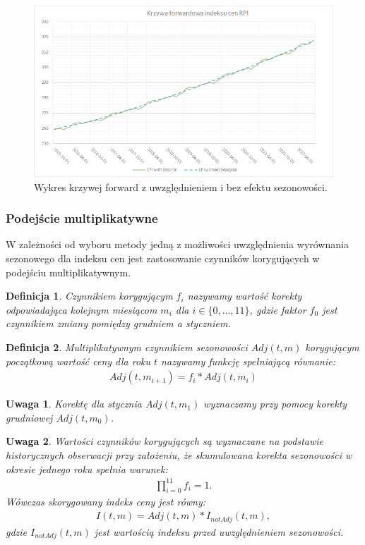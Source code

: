 \documentclass{mini}
\theoremstyle{mythstyle}
\newtheorem{Definicja}{Definicja}[chapter]
\newtheorem{Uwaga}{Uwaga}[chapter]
\begin{document}
	\begin{figure} [!h]
		\centering
		\includegraphics[scale=0.75]{graphics/rpi.png}
		\caption{Wykres krzywej forward z uwzględnieniem i bez efektu sezonowości.}
	\end{figure}
		
	\subsubsection*{Podejście multiplikatywne}
		W zależności od wyboru metody jedną z możliwości uwzględnienia wyrównania sezonowego dla indeksu cen jest zastosowanie czynników korygujących w podejściu multiplikatywnym.
	\begin{Definicja}
		Czynnikiem korygującym $f_i$ nazywamy wartość korekty odpowiadająca kolejnym miesiącom $m_i$ dla $i \in \{0,...,11\}$, gdzie faktor $f_0$ jest czynnikiem zmiany pomiędzy grudniem a styczniem.\\
	\end{Definicja}
	
	\begin{Definicja}
		Multiplikatywnym czynnikiem sezonowości $Adj(t,m)$ korygującym początkową wartość ceny dla roku $t$ nazywamy funkcję spełniającą równanie:
		\begin{eqnarray*}
			Adj(t, m_{i+1})  = f_i * Adj(t, m_i)
		\end{eqnarray*}
	\end{Definicja}
	\begin{Uwaga}
		Korektę dla stycznia $Adj(t, m_1)$ wyznaczamy przy pomocy korekty grudniowej $Adj(t, m_0)$.\\
	\end{Uwaga}

	\begin{Uwaga}
		 Wartości czynników korygujących są wyznaczane na podstawie historycznych obserwacji przy założeniu, że skumulowana korekta sezonowości w okresie jednego roku spełnia warunek:
		\begin{eqnarray*}
			\prod_{i=0}^{11} f_i = 1.
		\end{eqnarray*}
		Wówczas skorygowany indeks ceny jest równy:
		\begin{eqnarray*}
			I(t,m) = Adj(t,m) * I_{notAdj}(t,m),
		\end{eqnarray*}
		gdzie $I_{notAdj}(t,m)$ jest wartością indeksu przed uwzględnieniem sezonowości.
	\end{Uwaga}
\end{document}
